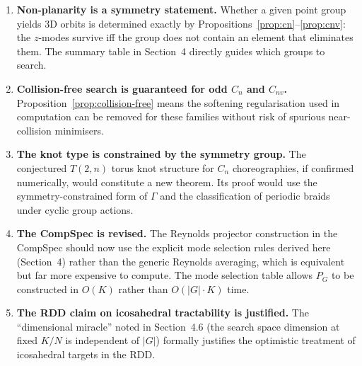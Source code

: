 \documentclass[12pt, a4paper]{article}
\theoremstyle{plain}
\theoremstyle{definition}
\begin{document}
\begin{enumerate}[leftmargin=1.8em]
  \item \textbf{Non-planarity is a symmetry statement.}  Whether a
        given point group yields 3D orbits is determined exactly by
        Propositions~\ref{prop:cn}--\ref{prop:cnv}: the $z$-modes
        survive iff the group does not contain an element that
        eliminates them.  The summary table in Section~4 directly
        guides which groups to search.
  \item \textbf{Collision-free search is guaranteed for odd $C_n$
        and $C_{nv}$.}  Proposition~\ref{prop:collision-free} means
        the softening regularisation used in computation can be
        removed for these families without risk of spurious
        near-collision minimisers.
  \item \textbf{The knot type is constrained by the symmetry group.}
        The conjectured $T(2,n)$ torus knot structure for $C_n$
        choreographies, if confirmed numerically, would constitute
        a new theorem.  Its proof would use the symmetry-constrained
        form of $\Gamma$ and the classification of periodic braids
        under cyclic group actions.
  \item \textbf{The CompSpec is revised.}  The Reynolds projector
        construction in the CompSpec should now use the explicit
        mode selection rules derived here (Section~4) rather than the
        generic Reynolds averaging, which is equivalent but far more
        expensive to compute.  The mode selection table allows
        $P_G$ to be constructed in $O(K)$ rather than $O(|G| \cdot K)$
        time.
  \item \textbf{The RDD claim on icosahedral tractability is justified.}
        The ``dimensional miracle'' noted in Section~4.6 (the search
        space dimension at fixed $K/N$ is independent of $|G|$)
        formally justifies the optimistic treatment of icosahedral
        targets in the RDD.
\end{enumerate}
\end{document}
